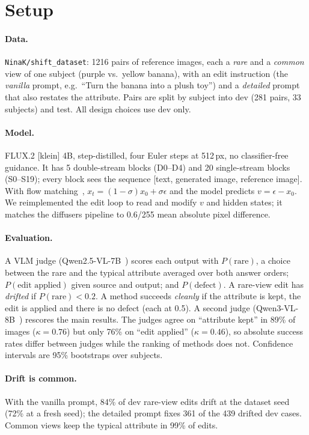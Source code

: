 \documentclass[10pt,twocolumn]{article}
\begin{document}
\section{Setup}
\paragraph{Data.} \texttt{NinaK/shift\_dataset}: 1216 pairs of reference images, each a \emph{rare} and a
\emph{common} view of one subject (purple vs.\ yellow banana), with an edit instruction (the \emph{vanilla} prompt, e.g.\
``Turn the banana into a plush toy'') and a \emph{detailed} prompt that also restates the attribute. Pairs are split by
subject into dev (281 pairs, 33 subjects) and test. All design choices use dev only.
\paragraph{Model.} FLUX.2 [klein] 4B, step-distilled, four Euler steps at 512\,px, no classifier-free guidance. It has 5
double-stream blocks (D0--D4) and 20 single-stream blocks (S0--S19); every block sees the sequence
[text, generated image, reference image]. With flow matching~\citep{flowmatching}, $x_t=(1-\sigma)x_0+\sigma\epsilon$ and the
model predicts $v=\epsilon-x_0$. We reimplemented the edit loop to read and modify $v$ and hidden states; it matches the
diffusers pipeline to 0.6/255 mean absolute pixel difference.
\paragraph{Evaluation.} A VLM judge (Qwen2.5-VL-7B~\citep{qwen25vl}) scores each output with $P(\text{rare})$, a choice between the
rare and the typical attribute averaged over both answer orders; $P(\text{edit applied})$ given source and output; and
$P(\text{defect})$. A rare-view edit has \emph{drifted} if $P(\text{rare})<0.2$. A method succeeds \emph{cleanly} if the
attribute is kept, the edit is applied and there is no defect (each at 0.5). A second judge (Qwen3-VL-8B~\citep{qwen3vl})
rescores the main results. The judges agree on ``attribute kept'' in 89\% of images ($\kappa=0.76$) but only 76\% on ``edit
applied'' ($\kappa=0.46$), so absolute success rates differ between judges while the ranking of methods does not. Confidence
intervals are 95\% bootstraps over subjects.

\paragraph{Drift is common.} With the vanilla prompt, 84\% of dev rare-view edits drift at the dataset seed (72\% at a fresh
seed); the detailed prompt fixes 361 of the 439 drifted dev cases. Common views keep the typical attribute in 99\% of edits.
\end{document}
